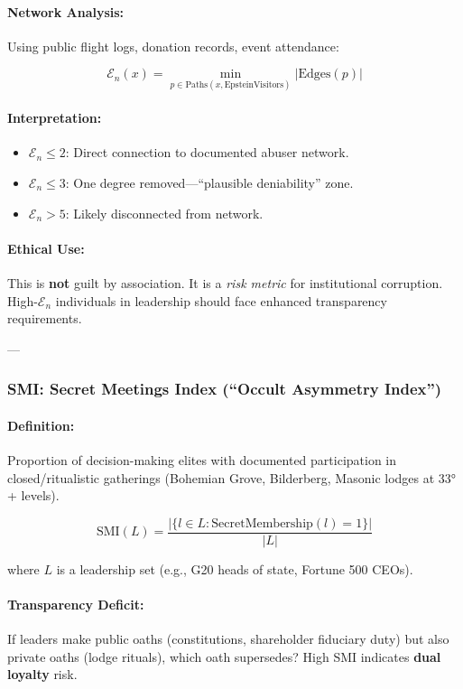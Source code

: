 \documentclass[11pt,a4paper]{article}
\theoremstyle{definition}
\theoremstyle{remark}
\begin{document}
\paragraph{Network Analysis:}
Using public flight logs, donation records, event attendance:

\[
\mathcal{E}_n(x) = \min_{p \in \text{Paths}(x, \text{EpsteinVisitors})} |\text{Edges}(p)|
\]

\paragraph{Interpretation:}
\begin{itemize}
\item $\mathcal{E}_n \leq 2$: Direct connection to documented abuser network.
\item $\mathcal{E}_n \leq 3$: One degree removed—``plausible deniability'' zone.
\item $\mathcal{E}_n > 5$: Likely disconnected from network.
\end{itemize}

\paragraph{Ethical Use:}
This is \textbf{not} guilt by association. It is a \textit{risk metric} for institutional corruption. High-$\mathcal{E}_n$ individuals in leadership should face enhanced transparency requirements.

---

\subsubsection{SMI: Secret Meetings Index (``Occult Asymmetry Index'')}

\paragraph{Definition:}
Proportion of decision-making elites with documented participation in closed/ritualistic gatherings (Bohemian Grove, Bilderberg, Masonic lodges at 33°+ levels).

\[
\text{SMI}(L) = \frac{|\{l \in L : \text{SecretMembership}(l) = 1\}|}{|L|}
\]

where $L$ is a leadership set (e.g., G20 heads of state, Fortune 500 CEOs).

\paragraph{Transparency Deficit:}
If leaders make public oaths (constitutions, shareholder fiduciary duty) but also private oaths (lodge rituals), which oath supersedes? High SMI indicates \textbf{dual loyalty} risk.
\end{document}
